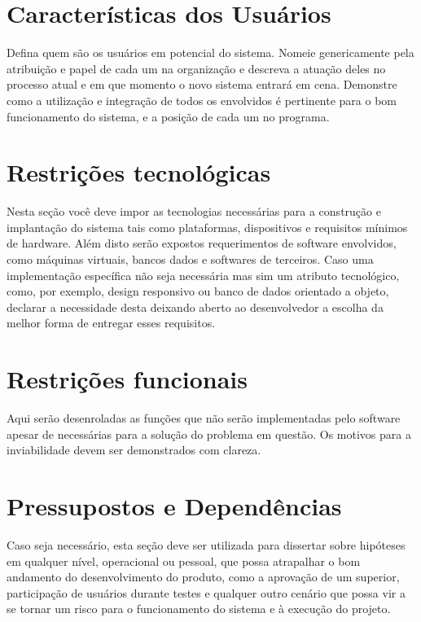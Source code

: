 \documentclass[12pt,openright,a4paper,brazil]{abntex2}
\begin{document}
\section{Características dos Usuários}

Defina quem são os usuários em potencial do sistema. Nomeie genericamente pela atribuição e papel de cada um na organização e descreva a atuação deles no processo atual e em que momento o novo sistema entrará em cena. Demonstre como a utilização e integração de todos os envolvidos é pertinente para o bom funcionamento do sistema, e a posição de cada um no programa.

\section{Restrições tecnológicas}

Nesta seção você deve impor as tecnologias necessárias para a construção e implantação do sistema tais como plataformas, dispositivos e requisitos mínimos de hardware. Além disto serão expostos requerimentos de software envolvidos, como máquinas virtuais, bancos dados e softwares de terceiros. Caso uma implementação específica não seja necessária mas sim um atributo tecnológico, como, por exemplo, design responsivo ou banco de dados orientado a objeto, declarar a necessidade desta deixando aberto ao desenvolvedor a escolha da melhor forma de entregar esses requisitos.

\section{Restrições funcionais}

Aqui serão desenroladas as funções que não serão implementadas pelo software apesar de necessárias para a solução do problema em questão. Os motivos para a inviabilidade devem ser demonstrados com clareza.

\section{Pressupostos e Dependências}

Caso seja necessário, esta seção deve ser utilizada para dissertar sobre hipóteses em qualquer nível, operacional ou pessoal, que possa atrapalhar o bom andamento do desenvolvimento do produto, como a aprovação de um superior, participação de usuários durante testes e qualquer outro cenário que possa vir a se tornar um risco para o funcionamento do sistema e à execução do projeto.
\end{document}

